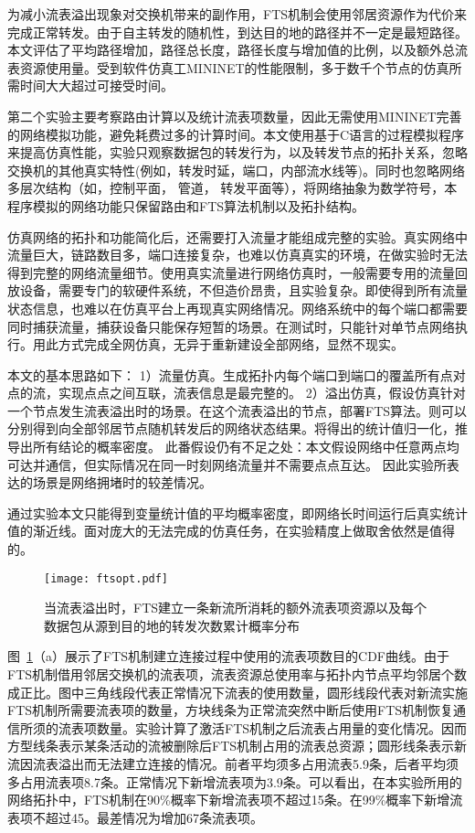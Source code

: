 为减小流表溢出现象对交换机带来的副作用，FTS机制会使用邻居资源作为代价来完成正常转发。由于自主转发的随机性，到达目的地的路径并不一定是最短路径。本文评估了平均路径增加，路径总长度，路径长度与增加值的比例，以及额外总流表资源使用量。受到软件仿真工MININET的性能限制，多于数千个节点的仿真所需时间大大超过可接受时间。

第二个实验主要考察路由计算以及统计流表项数量，因此无需使用MININET完善的网络模拟功能，避免耗费过多的计算时间。本文使用基于C语言的过程模拟程序来提高仿真性能，实验只观察数据包的转发行为，以及转发节点的拓扑关系，忽略交换机的其他真实特性(例如，转发时延，端口，内部流水线等)。同时也忽略网络多层次结构（如，控制平面， 管道， 转发平面等），将网络抽象为数学符号，本程序模拟的网络功能只保留路由和FTS算法机制以及拓扑结构。

仿真网络的拓扑和功能简化后，还需要打入流量才能组成完整的实验。真实网络中流量巨大，链路数目多，端口连接复杂，也难以仿真真实的环境，在做实验时无法得到完整的网络流量细节。使用真实流量进行网络仿真时，一般需要专用的流量回放设备，需要专门的软硬件系统，不但造价昂贵，且实验复杂。即使得到所有流量状态信息，也难以在仿真平台上再现真实网络情况。网络系统中的每个端口都需要同时捕获流量，捕获设备只能保存短暂的场景。在测试时，只能针对单节点网络执行。用此方式完成全网仿真，无异于重新建设全部网络，显然不现实。

本文的基本思路如下：
1）流量仿真。生成拓扑内每个端口到端口的覆盖所有点对点的流，实现点点之间互联，流表信息是最完整的。
2）溢出仿真，假设仿真针对一个节点发生流表溢出时的场景。在这个流表溢出的节点，部署FTS算法。则可以分别得到向全部邻居节点随机转发后的网络状态结果。将得出的统计值归一化，推导出所有结论的概率密度。
此番假设仍有不足之处：本文假设网络中任意两点均可达并通信，但实际情况在同一时刻网络流量并不需要点点互达。
因此实验所表达的场景是网络拥堵时的较差情况。

通过实验本文只能得到变量统计值的平均概率密度，即网络长时间运行后真实统计值的渐近线。面对庞大的无法完成的仿真任务，在实验精度上做取舍依然是值得的。

\begin{figure}[!ht]
	\centering 
	\vspace{-1.5mm} 
	\texttt{[image: ftsopt.pdf]}
	\caption{当流表溢出时，FTS建立一条新流所消耗的额外流表项资源以及每个数据包从源到目的地的转发次数累计概率分布} \label{fig:ftsopt}
\end{figure}

图~\ref{fig:ftsopt}（a）展示了FTS机制建立连接过程中使用的流表项数目的CDF曲线。由于FTS机制借用邻居交换机的流表项，流表资源总使用率与拓扑内节点平均邻居个数成正比。图中三角线段代表正常情况下流表的使用数量，圆形线段代表对新流实施FTS机制所需要流表项的数量，方块线条为正常流突然中断后使用FTS机制恢复通信所须的流表项数量。实验计算了激活FTS机制之后流表占用量的变化情况。因而方型线条表示某条活动的流被删除后FTS机制占用的流表总资源；圆形线条表示新流因流表溢出而无法建立连接的情况。前者平均须多占用流表5.9条，后者平均须多占用流表项8.7条。正常情况下新增流表项为3.9条。可以看出，在本实验所用的网络拓扑中，FTS机制在90\%概率下新增流表项不超过15条。在99\%概率下新增流表项不超过45。最差情况为增加67条流表项。

